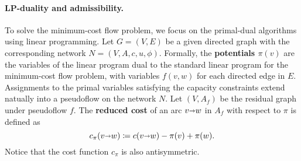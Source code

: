 \documentclass[11pt]{article}
\makeatletter
\def\fsupply{\phi}
\def\arcto{\mathord\shortrightarrow}
\def\arc#1#2{#1\arcto#2}
\theoremstyle{plain}
\numberwithin{figure}{section}
\def\EMPH#1{\textbf{\boldmath #1}}
\def\n@te#1{\textsf{\boldmath \textbf{$\langle\!\langle$#1$\rangle\!\rangle$}}\leavevmode}
\def\note#1{\textcolor{red}{\n@te{#1}}}
\makeatother
\begin{document}
%
%
%
%


\paragraph{LP-duality and admissibility.}
To solve the minimum-cost flow problem, we focus on the primal-dual algorithms using linear programming.
Let $G = (V,E)$ be a given directed graph with the corresponding network $N = (V,A,c,u,\fsupply)$.
Formally, the
\EMPH{potentials $\pi(v)$} are the variables of the linear program dual to the standard linear program for the minimum-cost flow problem, with variables $f(v,w)$ for each directed edge in $E$.
Assignments to the primal variables satisfying the capacity constraints extend natually into a pseudoflow on the network $N$.
Let $(V,A_f)$ be the residual graph under pseudoflow $f$.
The \EMPH{reduced cost} of an arc $\arc vw$ in $A_f$ with respect to $\pi$ is defined as
\[
\EMPH{$c_\pi(\arc vw)$} \coloneqq c(\arc vw) - \pi(v) + \pi(w).
\]
Notice that the cost function $c_\pi$ is also antisymmetric.
\end{document}
